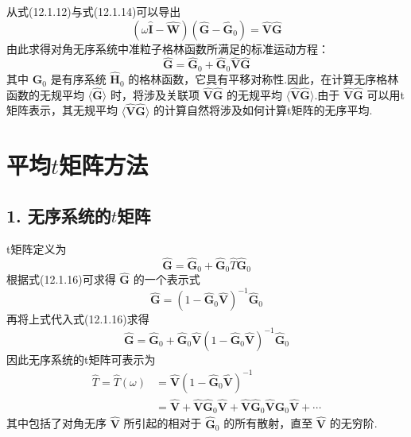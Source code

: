从式(12.1.12)与式(12.1.14)可以导出
\begin{equation}
  \left(\omega\hat{\boldsymbol{I}}-\hat{\boldsymbol{W}}\right)
  \left(\hat{\boldsymbol{G}}-\hat{\boldsymbol{G}}_{0}\right)=\hat{\boldsymbol{V}}\hat{\boldsymbol{G}}
\end{equation}
由此求得对角无序系统中准粒子格林函数所满足的标准运动方程：
\begin{equation}
  \hat{\boldsymbol{G}}=\hat{\boldsymbol{G}}_{0}+\hat{\boldsymbol{G}}_{0}\hat{\boldsymbol{V}}\hat{\boldsymbol{G}}
\end{equation}
其中 $\hat{\boldsymbol{G}}_{0}$ 是有序系统 $\hat{\boldsymbol{H}}_{0}$ 的格林函数，它具有平移对称性.因此，在计算无序格林函数的无规平均 $\langle\hat{\boldsymbol{G}}\rangle$ 时，将涉及关联项 $\hat{\boldsymbol{V}}\hat{\boldsymbol{G}}$ 的无规平均 $\langle\hat{\boldsymbol{V}}\hat{\boldsymbol{G}}\rangle$.由于 $\hat{\boldsymbol{V}}\hat{\boldsymbol{G}}$ 可以用t矩阵表示，其无规平均 $\langle\hat{\boldsymbol{V}}\hat{\boldsymbol{G}}\rangle$ 的计算自然将涉及如何计算t矩阵的无序平均.

\section{\texorpdfstring{平均$ t $矩阵方法}{平均t矩阵方法}}

\subsection*{1. 无序系统的$ t $矩阵}

t矩阵定义为
\begin{equation}
  \hat{\boldsymbol{G}}=\hat{\boldsymbol{G}}_{0}+\hat{\boldsymbol{G}}_{0}\hat{T}\hat{\boldsymbol{G}}_{0}
\end{equation}
根据式(12.1.16)可求得 $\hat{\boldsymbol{G}}$ 的一个表示式
\begin{equation}
  \hat{\boldsymbol{G}}=\left(1-\hat{\boldsymbol{G}}_{0}\hat{\boldsymbol{V}}\right)^{-1}\hat{\boldsymbol{G}}_{0}
\end{equation}
再将上式代入式(12.1.16)求得
\begin{equation}
  \hat{\boldsymbol{G}}=\hat{\boldsymbol{G}}_{0}+\hat{\boldsymbol{G}}_{0}\hat{\boldsymbol{V}}
  \left(1-\hat{\boldsymbol{G}}_{0}\hat{\boldsymbol{V}}\right)^{-1}\hat{\boldsymbol{G}}_{0}
\end{equation}
因此无序系统的t矩阵可表示为
\begin{equation}
\begin{aligned}
  \hat{T}=\hat{T}\left(\omega\right)
  &=\hat{\boldsymbol{V}}\left(1-\hat{\boldsymbol{G}}_{0}\hat{\boldsymbol{V}}\right)^{-1}\\
  &=\hat{\boldsymbol{V}}+\hat{\boldsymbol{V}}\hat{\boldsymbol{G}}_{0}\hat{\boldsymbol{V}}
  +\hat{\boldsymbol{V}}\hat{\boldsymbol{G}}_{0}\hat{\boldsymbol{V}}\hat{\boldsymbol{G}}_{0}\hat{\boldsymbol{V}}+\cdots
\end{aligned}
\end{equation}
其中包括了对角无序 $\hat{\boldsymbol{V}}$ 所引起的相对于 $\hat{\boldsymbol{G}}_{0}$ 的所有散射，直至 $\hat{\boldsymbol{V}}$ 的无穷阶.

